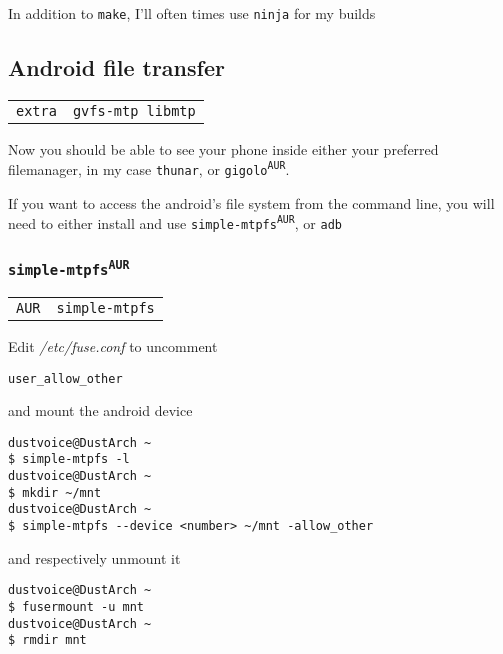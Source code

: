 \documentclass[9pt]{report}
\newenvironment{packagetable}
{\begin{longtabu}to \textwidth [b]{X[1,r]|X[1,l]}}
{\end{longtabu}}
\begin{document}
In addition to \texttt{make}, I’ll often times use \texttt{ninja} for my builds



\newpage

\hypertarget{x-android-file-transfer}{\subsection{Android file transfer}}
\begin{packagetable}
    \texttt{extra} & \texttt{gvfs-mtp libmtp} \\ 
\end{packagetable}

Now you should be able to see your phone inside either your preferred filemanager, in my case \texttt{thunar}, or \texttt{gigolo\textsuperscript{\texttt{AUR}}}.


If you want to access the android’s file system from the command line, you will need to either install and use \texttt{simple-mtpfs\textsuperscript{\texttt{AUR}}}, or \texttt{adb}



\newpage

\hypertarget{x-simple-mtpfs-aur}{\subsubsection{\texttt{simple-mtpfs\textsuperscript{\texttt{AUR}}}}}
\begin{packagetable}
    \texttt{AUR} & \texttt{simple-mtpfs} \\ 
\end{packagetable}

Edit \textit{/etc/fuse.conf} to uncomment


\begin{verbatim}
user_allow_other
\end{verbatim}

and mount the android device


\begin{verbatim}
dustvoice@DustArch ~
$ simple-mtpfs -l
dustvoice@DustArch ~
$ mkdir ~/mnt
dustvoice@DustArch ~
$ simple-mtpfs --device <number> ~/mnt -allow_other
\end{verbatim}

and respectively unmount it


\begin{verbatim}
dustvoice@DustArch ~
$ fusermount -u mnt
dustvoice@DustArch ~
$ rmdir mnt
\end{verbatim}
\end{document}
